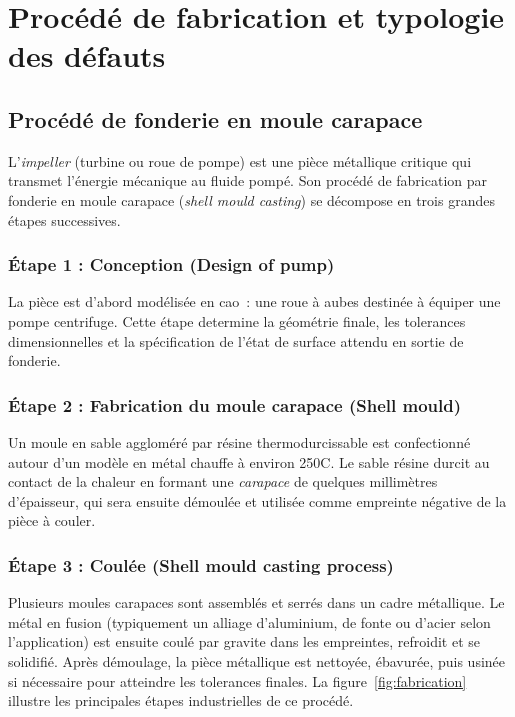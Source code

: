 \documentclass[12pt,a4paper,openany]{report}
\begin{document}
\chapter{Procédé de fabrication et typologie des défauts}

\section{Procédé de fonderie en moule carapace}

L'\emph{impeller} (turbine ou roue de pompe) est une pièce métallique critique qui transmet l'énergie mécanique au fluide pompé. Son procédé de fabrication par fonderie en moule carapace (\emph{shell mould casting}) se décompose en trois grandes étapes successives.

\subsection{Étape 1 : Conception (Design of pump)}

La pièce est d'abord modélisée en \gls{cao}~: une roue à aubes destinée à équiper une pompe centrifuge. Cette étape determine la géométrie finale, les tolerances dimensionnelles et la spécification de l'état de surface attendu en sortie de fonderie.

\subsection{Étape 2 : Fabrication du moule carapace (Shell mould)}

Un moule en sable aggloméré par résine thermodurcissable est confectionné autour d'un modèle en métal chauffe à environ 250\textdegree C. Le sable résine durcit au contact de la chaleur en formant une \emph{carapace} de quelques millimètres d'épaisseur, qui sera ensuite démoulée et utilisée comme empreinte négative de la pièce à couler.

\subsection{Étape 3 : Coulée (Shell mould casting process)}

Plusieurs moules carapaces sont assemblés et serrés dans un cadre métallique. Le métal en fusion (typiquement un alliage d'aluminium, de fonte ou d'acier selon l'application) est ensuite coulé par gravite dans les empreintes, refroidit et se solidifié. Après démoulage, la pièce métallique est nettoyée, ébavurée, puis usinée si nécessaire pour atteindre les tolerances finales. La figure~\ref{fig:fabrication} illustre les principales étapes industrielles de ce procédé.
\end{document}
